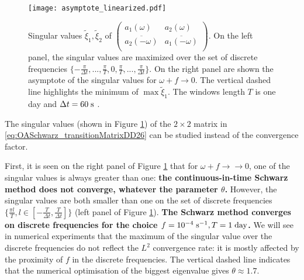 \begin{figure}
    \centering
    \texttt{[image: asymptote\_linearized.pdf]}
	\caption{Singular values
	$\widetilde{\xi}_1, \widetilde{\xi}_2$ of $\begin{pmatrix}
	a_1(\omega) & a_2(\omega) \\
	\overline{a_2(-\omega)} & \overline{a_1(-\omega)} \\
	\end{pmatrix}$.
	On the left panel, the singular values are maximized over the
	set of discrete frequencies
	$\{-\frac{\pi}{\Delta t}, ..., \frac{\pi}{T}, 0,
	\frac{\pi}{T},..., \frac{\pi}{\Delta t}\}$.
	On the right panel are shown
	the asymptote of the singular values for $\omega+f \to 0$.
	The vertical dashed line highlights the minimum
	of $\max \widetilde{\xi}_1$.
	The windows length $T$ is one day
	and $\Delta t=60\;{\rm s}$ .
	}
    \label{fig:OASchwarz_nonasymptotic}
\end{figure}
The singular values (shown in Figure \ref{fig:OASchwarz_nonasymptotic})
of the $2\times 2$ matrix
in \eqref{eq:OASchwarz_transitionMatrixDD26}
can be studied instead of the convergence factor.
\par
First, it is seen on the right panel of Figure
\ref{fig:OASchwarz_nonasymptotic} that for
$\omega+ f \rightarrow\to 0$,
one of the singular values is always greater than one:
\textbf{the continuous-in-time Schwarz method does not
converge, whatever the parameter $\theta$.}
However, the singular values are both smaller than one
on the set of discrete frequencies
$\{\frac{\pi l}{T},
l \in [-\frac{T}{\Delta t},\frac{T}{\Delta t}]\}$
(left panel of Figure \ref{fig:OASchwarz_nonasymptotic}).
\textbf{The Schwarz method converges on discrete frequencies
for the choice $f=10^{-4} \; {\rm s}^{-1}, T=1 \; {\rm day}$.}
We will see in numerical experiments that the maximum of the
singular value over the discrete frequencies do not reflect the $L^2$
convergence rate:
it is mostly affected by the proximity of $f$ in the discrete
frequencies.
The vertical dashed line indicates that the numerical
optimisation of the biggest eigenvalue gives
$\theta \approx 1.7$.


